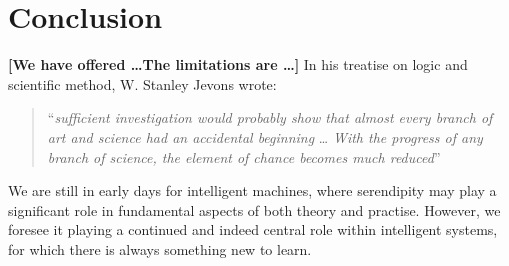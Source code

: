 \section{Conclusion} \label{sec:conclusion}

\textbf{[We have offered \ldots The limitations are \ldots]}
In his treatise on logic and scientific method, W. Stanley Jevons
wrote:
\begin{quote}
``\emph{sufficient investigation would probably show that almost every
    branch of art and science had an accidental beginning} \ldots
  \emph{With the progress of any branch of science, the element of
    chance becomes much reduced}'' \cite[p. 531]{jevons:1877}
\end{quote}
We are still in early days for intelligent machines, where serendipity
may play a significant role in fundamental aspects of both theory and
practise.  However, we foresee it playing a continued and indeed
central role within intelligent systems, for which there is always
something new to learn.
